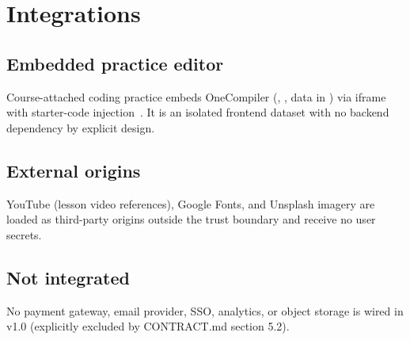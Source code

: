 \section{Integrations}
\label{sec:integrations}

\subsection{Embedded practice editor}

Course-attached coding practice embeds OneCompiler (, , data in ) via iframe with  starter-code injection~\cite{onecompiler}. It is an isolated frontend dataset with no backend dependency by explicit design.

\subsection{External origins}

YouTube (lesson video references), Google Fonts, and Unsplash imagery are loaded as third-party origins outside the trust boundary and receive no user secrets.

\subsection{Not integrated}

No payment gateway, email provider, SSO, analytics, or object storage is wired in v1.0 (explicitly excluded by CONTRACT.md section 5.2).
